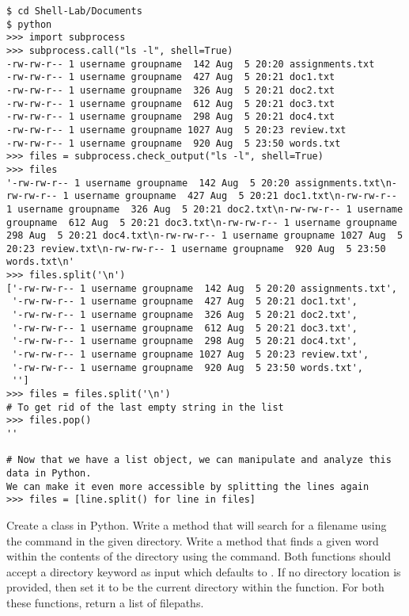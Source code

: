 \begin{lstlisting}
$ cd Shell-Lab/Documents
$ python
>>> import subprocess
>>> subprocess.call("ls -l", shell=True)
-rw-rw-r-- 1 username groupname  142 Aug  5 20:20 assignments.txt
-rw-rw-r-- 1 username groupname  427 Aug  5 20:21 doc1.txt
-rw-rw-r-- 1 username groupname  326 Aug  5 20:21 doc2.txt
-rw-rw-r-- 1 username groupname  612 Aug  5 20:21 doc3.txt
-rw-rw-r-- 1 username groupname  298 Aug  5 20:21 doc4.txt
-rw-rw-r-- 1 username groupname 1027 Aug  5 20:23 review.txt
-rw-rw-r-- 1 username groupname  920 Aug  5 23:50 words.txt
>>> files = subprocess.check_output("ls -l", shell=True)
>>> files
'-rw-rw-r-- 1 username groupname  142 Aug  5 20:20 assignments.txt\n-rw-rw-r-- 1 username groupname  427 Aug  5 20:21 doc1.txt\n-rw-rw-r-- 1 username groupname  326 Aug  5 20:21 doc2.txt\n-rw-rw-r-- 1 username groupname  612 Aug  5 20:21 doc3.txt\n-rw-rw-r-- 1 username groupname  298 Aug  5 20:21 doc4.txt\n-rw-rw-r-- 1 username groupname 1027 Aug  5 20:23 review.txt\n-rw-rw-r-- 1 username groupname  920 Aug  5 23:50 words.txt\n'
>>> files.split('\n')
['-rw-rw-r-- 1 username groupname  142 Aug  5 20:20 assignments.txt',
 '-rw-rw-r-- 1 username groupname  427 Aug  5 20:21 doc1.txt',
 '-rw-rw-r-- 1 username groupname  326 Aug  5 20:21 doc2.txt',
 '-rw-rw-r-- 1 username groupname  612 Aug  5 20:21 doc3.txt',
 '-rw-rw-r-- 1 username groupname  298 Aug  5 20:21 doc4.txt',
 '-rw-rw-r-- 1 username groupname 1027 Aug  5 20:23 review.txt',
 '-rw-rw-r-- 1 username groupname  920 Aug  5 23:50 words.txt',
 '']
>>> files = files.split('\n')
# To get rid of the last empty string in the list
>>> files.pop()
''

# Now that we have a list object, we can manipulate and analyze this data in Python.
We can make it even more accessible by splitting the lines again
>>> files = [line.split() for line in files]
\end{lstlisting}

\begin{problem}
Create a  class in Python.
Write a  method that will search for a filename using the  command in the given directory.
Write a  method that finds a given word within the contents of the directory using the  command.
Both functions should accept a directory keyword as input which defaults to .
If no directory location is provided, then set it to be the current directory within the function.
For both these functions, return a list of filepaths.
\end{problem}

